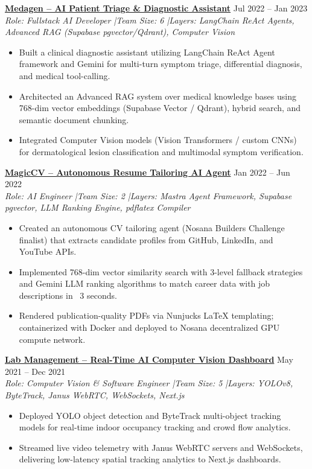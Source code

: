 \documentclass[10pt,a4paper]{article}
\begin{document}
\vspace{0.4em}
\href{https://github.com/nxc1802/Medagen}{\textbf{Medagen -- AI Patient Triage \& Diagnostic Assistant}} \hfill Jul 2022 -- Jan 2023 \\
\emph{Role: Fullstack AI Developer \quad|\quad Team Size: 6 \quad|\quad Layers: LangChain ReAct Agents, Advanced RAG (Supabase pgvector/Qdrant), Computer Vision}
\begin{itemize}
\item Built a clinical diagnostic assistant utilizing LangChain ReAct Agent framework and Gemini for multi-turn symptom triage, differential diagnosis, and medical tool-calling.
\item Architected an Advanced RAG system over medical knowledge bases using 768-dim vector embeddings (Supabase Vector / Qdrant), hybrid search, and semantic document chunking.
\item Integrated Computer Vision models (Vision Transformers / custom CNNs) for dermatological lesion classification and multimodal symptom verification.
\end{itemize}

\vspace{0.4em}
\href{https://github.com/nxc1802/MagiCV}{\textbf{MagicCV -- Autonomous Resume Tailoring AI Agent}} \hfill Jan 2022 -- Jun 2022 \\
\emph{Role: AI Engineer \quad|\quad Team Size: 2 \quad|\quad Layers: Mastra Agent Framework, Supabase pgvector, LLM Ranking Engine, pdflatex Compiler}
\begin{itemize}
\item Created an autonomous CV tailoring agent (Nosana Builders Challenge finalist) that extracts candidate profiles from GitHub, LinkedIn, and YouTube APIs.
\item Implemented 768-dim vector similarity search with 3-level fallback strategies and Gemini LLM ranking algorithms to match career data with job descriptions in ~3 seconds.
\item Rendered publication-quality PDFs via Nunjucks LaTeX templating; containerized with Docker and deployed to Nosana decentralized GPU compute network.
\end{itemize}

\vspace{0.4em}
\href{https://github.com/manhmitcf/DAT_Lab_Management}{\textbf{Lab Management -- Real-Time AI Computer Vision Dashboard}} \hfill May 2021 -- Dec 2021 \\
\emph{Role: Computer Vision \& Software Engineer \quad|\quad Team Size: 5 \quad|\quad Layers: YOLOv8, ByteTrack, Janus WebRTC, WebSockets, Next.js}
\begin{itemize}
\item Deployed YOLO object detection and ByteTrack multi-object tracking models for real-time indoor occupancy tracking and crowd flow analytics.
\item Streamed live video telemetry with Janus WebRTC servers and WebSockets, delivering low-latency spatial tracking analytics to Next.js dashboards.
\end{itemize}
\end{document}
